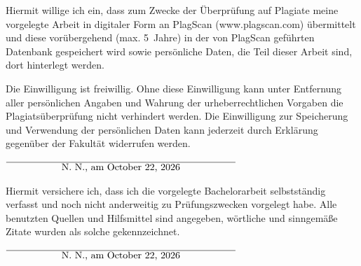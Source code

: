 \documentclass[12pt,twoside=false,a4paper,parskip]{scrbook}
\def\BaAuthor{Fabian Frank Werner}
\def\ShowBaAuthor{\BaAuthor}
\def\ShowBaAuthor{N.~N.}
\begin{document}
Hiermit willige ich ein, dass zum Zwecke der Überprüfung auf Plagiate meine vorgelegte Arbeit in digitaler Form an PlagScan (www.plagscan.com) übermittelt und diese vorübergehend (max. 5~Jahre) in der von PlagScan geführten Datenbank gespeichert wird sowie persönliche Daten, die Teil dieser Arbeit sind, dort hinterlegt werden.
\begin{small}
  Die Einwilligung ist freiwillig. Ohne diese Einwilligung kann unter Entfernung aller persönlichen Angaben und Wahrung der urheberrechtlichen Vorgaben die Plagiatsüberprüfung nicht verhindert werden. Die Einwilligung zur Speicherung und Verwendung der persönlichen Daten kann jederzeit durch Erklärung gegenüber der Fakultät widerrufen werden.
\end{small}
\vspace{20pt}
\begin{flushright}
  $\overline{~~~~~~~~~~~~~~~~~\mbox{\ShowBaAuthor, am \today}~~~~~~~~~~~~~~~~~}$
\end{flushright}

Hiermit versichere ich, dass ich die vorgelegte Bachelorarbeit selbstständig verfasst und noch nicht anderweitig zu Prüfungszwecken vorgelegt habe. Alle benutzten Quellen und Hilfsmittel sind angegeben, wörtliche und sinngemäße Zitate wurden als solche gekennzeichnet.
\vspace{20pt}
\begin{flushright}
$\overline{~~~~~~~~~~~~~~~~~\mbox{\ShowBaAuthor, am \today}~~~~~~~~~~~~~~~~~}$
\end{flushright}
\end{document}
